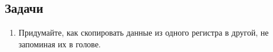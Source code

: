 \subsection{Задачи}

\begin{enumerate}
    \item Придумайте, как скопировать данные из одного регистра в другой, не запоминая их в голове.
\end{enumerate}
